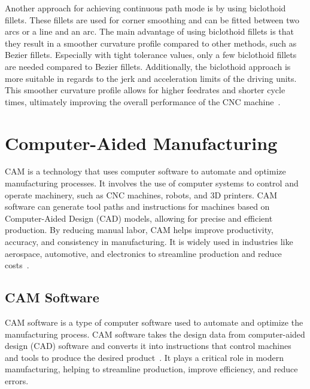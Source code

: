 Another approach for achieving continuous path mode is by using biclothoid fillets. These fillets are used for corner smoothing and can be fitted between two arcs or a line and an arc. The main advantage of using biclothoid fillets is that they result in a smoother curvature profile compared to other methods, such as Bezier fillets. Especially with tight tolerance values, only a few biclothoid fillets are needed compared to Bezier fillets. Additionally, the biclothoid approach is more suitable in regards to the jerk and acceleration limits of the driving units. This smoother curvature profile allows for higher feedrates and shorter cycle times, ultimately improving the overall performance of the CNC machine~\cite{Shahzadeh.2018}. 






\newpage
\section{Computer-Aided Manufacturing}\label{CAMmain}

CAM is a technology that uses computer software to automate and optimize manufacturing processes. It involves the use of computer systems to control and operate machinery, such as CNC machines, robots, and 3D printers. CAM software can generate tool paths and instructions for machines based on Computer-Aided Design (CAD) models, allowing for precise and efficient production. By reducing manual labor, CAM helps improve productivity, accuracy, and consistency in manufacturing. It is widely used in industries like aerospace, automotive, and electronics to streamline production and reduce costs~\cite{Bi.2021}.

\subsection{CAM Software}

CAM software is a type of computer software used to automate and optimize the manufacturing process. CAM software takes the design data from computer-aided design (CAD) software and converts it into instructions that control machines and tools to produce the desired product~\cite{Bi.2021}. It plays a critical role in modern manufacturing, helping to streamline production, improve efficiency, and reduce errors.

